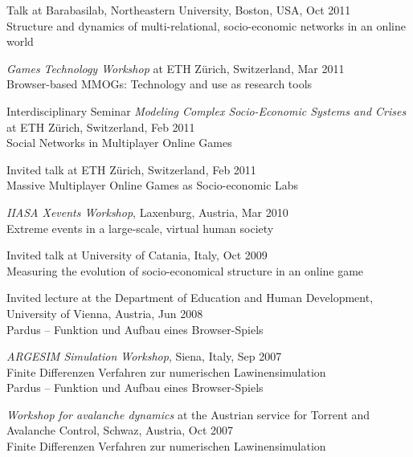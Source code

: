 \documentclass[10pt,a4paper]{article}
\renewenvironment{itemize}{
  \begin{list}{}{
    \setlength{\leftmargin}{1.5em}
    \setlength{\itemsep}{0.25em}
    \setlength{\parskip}{0pt}
    \setlength{\parsep}{0.25em}
  }
}{
  \end{list}
}
\begin{document}
\begin{itemize}
\item{Talk at Barabasilab, Northeastern University, Boston, USA, Oct 2011\\Structure and dynamics of multi-relational, socio-economic networks in an online world}
\item{\emph{Games Technology Workshop} at ETH Z{\"u}rich, Switzerland, Mar 2011\\{Browser-based MMOGs: Technology and use as research tools}}
\item{Interdisciplinary Seminar \emph{Modeling Complex Socio-Economic Systems and Crises} at ETH Z{\"u}rich, Switzerland, Feb 2011\\ {Social Networks in Multiplayer Online Games}}
\item{Invited talk at ETH Z{\"u}rich, Switzerland, Feb 2011\\ {Massive Multiplayer Online Games as Socio-economic Labs}}
\item{\emph{IIASA Xevents Workshop}, Laxenburg, Austria, Mar 2010\\ {Extreme events in a large-scale, virtual human society}}
\item{Invited talk at University of Catania, Italy, Oct 2009\\ {Measuring the evolution of socio-economical structure in an online game}}
\item{Invited lecture at the Department of Education and Human Development, University of Vienna, Austria, Jun 2008\\ {Pardus -- Funktion und Aufbau eines Browser-Spiels}}
\item{\emph{ARGESIM Simulation Workshop}, Siena, Italy, Sep 2007\\ {Finite Differenzen Verfahren zur numerischen Lawinensimulation}\\ {Pardus -- Funktion und Aufbau eines Browser-Spiels}}
\item{\emph{Workshop for avalanche dynamics} at the Austrian service for Torrent and Avalanche Control, Schwaz, Austria, Oct 2007\\ {Finite Differenzen Verfahren zur numerischen Lawinensimulation}}
\end{itemize}
\end{document}
